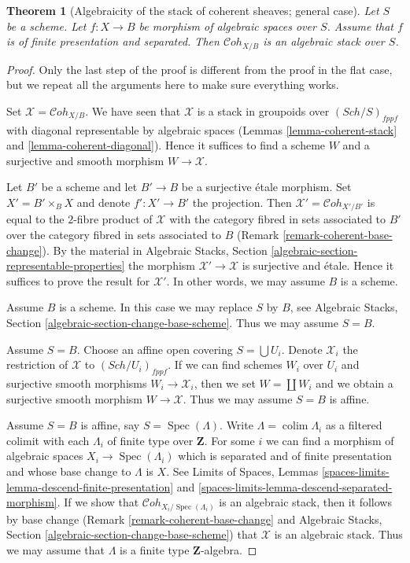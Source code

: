 \documentclass{stacks-project}
\theoremstyle{plain}
\newtheorem{theorem}[subsection]{Theorem}
\theoremstyle{definition}
\theoremstyle{remark}
\numberwithin{equation}{subsection}
\def\colim{\mathop{\mathrm{colim}}\nolimits}
\def\Spec{\mathop{\mathrm{Spec}}}
\def\Sch{\mathit{Sch}}
\def\Cohstack{\mathcal{C}\!\mathit{oh}}
\begin{document}
\begin{theorem}[Algebraicity of the stack of coherent sheaves; general case]
\label{theorem-coherent-algebraic-general}
Let $S$ be a scheme. Let $f : X \to B$ be morphism of algebraic spaces
over $S$. Assume that $f$ is of finite presentation and separated. Then
$\Cohstack_{X/B}$ is an algebraic stack over $S$.
\end{theorem}

\begin{proof}
Only the last step of the proof is different from the proof
in the flat case, but we repeat all the arguments here to make 
sure everything works.

\medskip\noindent
Set $\mathcal{X} = \Cohstack_{X/B}$. We have seen that $\mathcal{X}$
is a stack in groupoids over $(\Sch/S)_{fppf}$ with diagonal representable
by algebraic spaces
(Lemmas \ref{lemma-coherent-stack} and \ref{lemma-coherent-diagonal}).
Hence it suffices to find a scheme $W$ and a surjective and smooth
morphism $W \to \mathcal{X}$.

\medskip\noindent
Let $B'$ be a scheme and let $B' \to B$ be a surjective \'etale morphism.
Set $X' = B' \times_B X$ and denote $f' : X' \to B'$ the projection.
Then $\mathcal{X}' = \Cohstack_{X'/B'}$ is equal to the $2$-fibre
product of $\mathcal{X}$ with the category fibred in sets
associated to $B'$ over the category fibred in sets associated to $B$
(Remark \ref{remark-coherent-base-change}). By the material in
Algebraic Stacks, Section \ref{algebraic-section-representable-properties}
the morphism $\mathcal{X}' \to \mathcal{X}$ is surjective and \'etale.
Hence it suffices to prove the result for $\mathcal{X}'$.
In other words, we may assume $B$ is a scheme.

\medskip\noindent
Assume $B$ is a scheme. In this case we may replace $S$ by $B$, see
Algebraic Stacks, Section \ref{algebraic-section-change-base-scheme}.
Thus we may assume $S = B$.

\medskip\noindent
Assume $S = B$. Choose an affine open covering $S = \bigcup U_i$.
Denote $\mathcal{X}_i$ the restriction of $\mathcal{X}$ to
$(\Sch/U_i)_{fppf}$. If we can find schemes $W_i$ over $U_i$ and
surjective smooth morphisms $W_i \to \mathcal{X}_i$, then we
set $W = \coprod W_i$ and we obtain a surjective smooth morphism
$W \to \mathcal{X}$. Thus we may assume $S = B$ is affine.

\medskip\noindent
Assume $S = B$ is affine, say $S = \Spec(\Lambda)$.
Write $\Lambda = \colim \Lambda_i$ as a filtered colimit with each $\Lambda_i$
of finite type over $\mathbf{Z}$. For some $i$ we can find
a morphism of algebraic spaces $X_i \to \Spec(\Lambda_i)$
which is separated and of finite presentation and whose base change
to $\Lambda$ is $X$. See Limits of Spaces, Lemmas
\ref{spaces-limits-lemma-descend-finite-presentation} and
\ref{spaces-limits-lemma-descend-separated-morphism}.
If we show that $\Cohstack_{X_i/\Spec(\Lambda_i)}$ is an
algebraic stack, then it follows by base change
(Remark \ref{remark-coherent-base-change} and
Algebraic Stacks, Section \ref{algebraic-section-change-base-scheme})
that $\mathcal{X}$ is an algebraic stack.
Thus we may assume that $\Lambda$ is a finite type $\mathbf{Z}$-algebra.


\end{proof}
\end{document}

